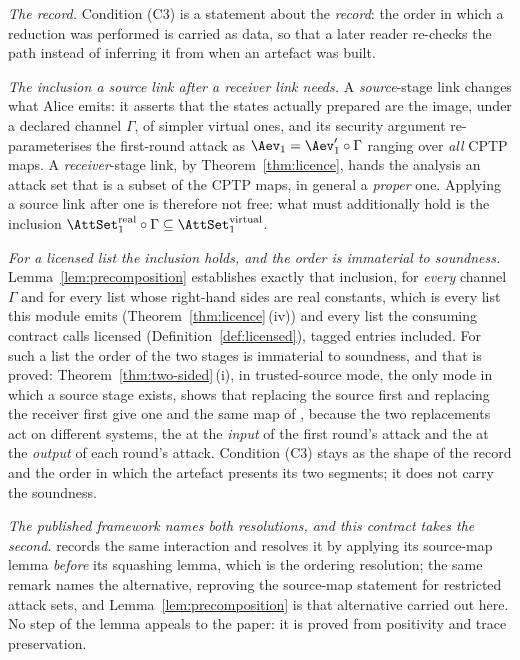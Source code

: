 \begin{remark}\label{rem:ordering}
\emph{The record.} Condition (C3) is a statement about the \emph{record}: the
order in which a reduction was performed is carried as data, so that a later
reader re-checks the path instead of inferring it from when an artefact was
built.

\emph{The inclusion a source link after a receiver link needs.} A \emph{source}-stage
link changes what Alice emits: it asserts that the states actually prepared
are the image, under a declared channel $\Gamma$, of simpler virtual ones, and
its security argument re-parameterises the first-round attack as
$\Aev_1=\Aev'_1\circ\Gamma$ ranging over \emph{all} CPTP maps. A
\emph{receiver}-stage link, by Theorem~\ref{thm:licence}, hands the analysis
an attack set that is a subset of the CPTP maps, in general a \emph{proper}
one. Applying a
source link after one is therefore not free: what must additionally hold is
the inclusion
$\AttSet^{\mathrm{real}}_1\circ\Gamma\subseteq\AttSet^{\mathrm{virtual}}_1$.

\emph{For a licensed list the inclusion holds, and the order is immaterial to
soundness.}
Lemma~\ref{lem:precomposition} establishes exactly that inclusion, for
\emph{every} channel $\Gamma$ and for every list whose right-hand sides are
real constants, which is every list this module emits
(Theorem~\ref{thm:licence}\,(iv)) and every list the consuming contract calls
licensed (Definition~\ref{def:licensed}), tagged entries included. For such a
list the order of the two stages is immaterial to soundness, and that is
proved: Theorem~\ref{thm:two-sided}\,(i), in trusted-source mode, the only
mode in which a source stage exists, shows that replacing the source first
and replacing the receiver first give one and the same map of
, because the two replacements act
on different systems, the  at the \emph{input} of the
first round's attack and the  at the \emph{output} of
each round's attack. Condition (C3) stays as the shape of the record and the
order in which the artefact presents its two segments; it does not carry the
soundness.

\emph{The published framework names both resolutions, and this contract takes
the second.} \cite[Rem.~9.2]{tupkary2026decoy} records the same interaction and
resolves it by applying its source-map lemma \emph{before} its squashing
lemma, which is the ordering resolution; the same remark names the
alternative, reproving the source-map statement for restricted attack sets,
and Lemma~\ref{lem:precomposition} is that alternative carried out here. No
step of the lemma appeals to the paper: it is proved from positivity and trace
preservation.


\end{remark}
